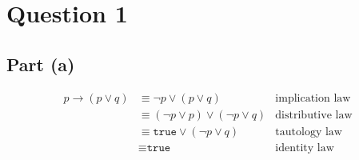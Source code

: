 \documentclass[11pt, a4paper]{article}
\begin{document}
\section{Question 1}
\subsection{Part (a)}
\begin{align*}
	p \to (p \lor q) &\equiv \neg p \lor (p \lor q)               & \text{implication law} \\
			 &\equiv (\neg p \lor p) \lor (\neg p \lor q) & \text{distributive law} \\
			 &\equiv \texttt{true} \lor (\neg p \lor q)   & \text{tautology law} \\
			 &\equiv \texttt{true}                        & \text{identity law}
\end{align*}
\end{document}
